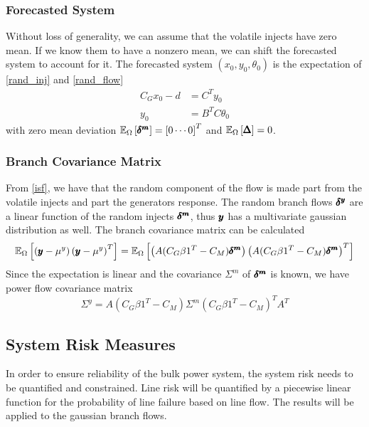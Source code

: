 \subsubsection*{Forecasted System}
Without loss of generality, we can assume that the volatile injects have zero mean.  If we know them to have a nonzero mean, we can shift the forecasted system to account for it. 
The forecasted system  $\left(x_0, y_0, \theta_0\right)$ is the expectation of \ref{rand_inj} and \ref{rand_flow}
\begin{align*}
C_G x_0 - d &= C^T y_0 \\
y_0 &= B^T C \theta_0 
\end{align*}
with zero mean deviation $\mathbb{E}_{\Omega} \left[ \pmb{\delta^m} \right]=\left[0 \cdots 0\right]^T$ and $\mathbb{E}_{\Omega} \left[ \pmb{\Delta} \right]=0$. 


\subsubsection*{Branch Covariance Matrix}

From \ref{isf}, we have that the random component of the flow is made part from the volatile injects and part the generators response.   The random branch flows $\pmb{\delta^y}$ are a linear function of the random injects $\pmb{\delta^m}$, thus $\pmb{y}$ has a multivariate gaussian distribution as well.  The branch covariance matrix can be calculated
\begin{equation*}
\mathbb{E}_{\Omega} \left[  \left( \pmb{y} - \mu^y \right) \left( \pmb{y} - \mu^y \right)^T  \right] = \mathbb{E}_{\Omega} \left[ \left( A(C_G\beta 1^T - C_M) \pmb{\delta^m} \right) \left( A(C_G\beta 1^T - C_M )\pmb{\delta^m} \right)^T  \right] 
\end{equation*}
Since the expectation is linear and the covariance $\Sigma^m$ of $\pmb{\delta^m}$ is known, we 
have power flow covariance matrix
\begin{equation}\label{branch_cov}
\Sigma^y = A(C_G\beta 1^T - C_M) \Sigma^m (C_G\beta 1^T - C_M)^T A^T
\end{equation}



\subsection{System Risk Measures}
In order to ensure reliability of the bulk power system, the system risk needs to be quantified and constrained.  Line risk will be quantified by a piecewise linear function for the probability of line failure based on line flow.  The results will be applied to the gaussian branch flows.

